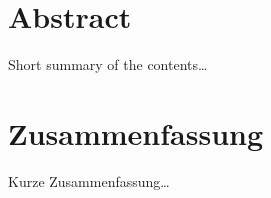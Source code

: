 

\begingroup
\let\clearpage\relax
\let\cleardoublepage\relax
\let\cleardoublepage\relax

\chapter*{Abstract} %

Short summary of the contents\dots

\endgroup

\vfill
\pagebreak



\begingroup
\let\clearpage\relax
\let\cleardoublepage\relax
\let\cleardoublepage\relax

\chapter*{Zusammenfassung} %

Kurze Zusammenfassung\dots

\endgroup

\vfill

